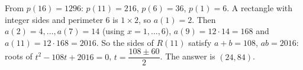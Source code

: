 From $p(16)=1296$: $p(11)=216$, $p(6)=36$, $p(1)=6$. A rectangle with integer sides and perimeter $6$ is $1\times2$, so $a(1)=2$. Then $a(2)=4,\dots,a(7)=14$ (using $x=1,\dots,6$), $a(9)=12\cdot14=168$ and $a(11)=12\cdot168=2016$. So the sides of $R(11)$ satisfy $a+b=108$, $ab=2016$: roots of $t^2-108t+2016=0$, $t=\dfrac{108\pm60}{2}$. The answer is $\boxed{(24,84)}$.
